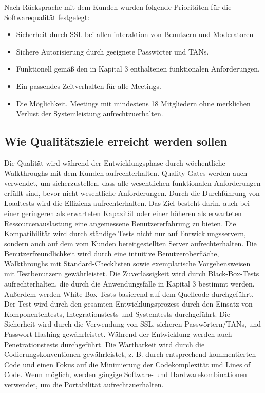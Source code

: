     Nach Rücksprache mit dem Kunden wurden folgende Prioritäten für die Softwarequalität festgelegt:

		\begin{itemize}
			\item Sicherheit durch SSL bei allen interaktion von Benutzern und Moderatoren
            \item Sichere Autorisierung durch geeignete Passwörter und TANs.
            \item Funktionell gemäß den in Kapital 3 enthaltenen funktionalen Anforderungen.
            \item Ein passendes Zeitverhalten für alle Meetings.
            \item Die Möglichkeit, Meetings mit mindestens 18 Mitgliedern ohne merklichen Verlust der Systemleistung aufrechtzuerhalten.

		\end{itemize}

	\subsection{Wie Qualitätsziele erreicht werden sollen}
	
	Die Qualität wird während der Entwicklungsphase durch wöchentliche Walkthroughs mit dem Kunden aufrechterhalten. Quality Gates werden auch verwendet, um sicherzustellen, dass alle wesentlichen funktionalen Anforderungen erfüllt sind, bevor nicht wesentliche Anforderungen.
	\linebreak
	Durch die Durchführung von Loadtests wird die Effizienz aufrechterhalten. Das Ziel besteht darin, auch bei einer geringeren als erwarteten Kapazität oder einer höheren als erwarteten Ressourcenauslastung eine angemessene Benutzererfahrung zu bieten.
	\linebreak
	Die Kompatibilität wird durch ständige Tests nicht nur auf Entwicklungsservern, sondern auch auf dem vom Kunden bereitgestellten Server aufrechterhalten.
	\linebreak
	Die Benutzerfreundlichkeit wird durch eine intuitive Benutzeroberfläche, Walkthroughs mit Standard-Checklisten sowie exemplarische Vorgehensweisen mit Testbenutzern gewährleistet.
	\linebreak
	Die Zuverlässigkeit wird durch Black-Box-Tests aufrechterhalten, die durch die Anwendungsfälle in Kapital 3 bestimmt werden. Außerdem werden White-Box-Tests basierend auf dem Quellcode durchgeführt. Der Test wird durch den gesamten Entwicklungsprozess durch den Einsatz von Komponententests, Integrationstests und Systemtests durchgeführt.
	\linebreak
	Die Sicherheit wird durch die Verwendung von SSL, sicheren Passwörtern/TANs, und Passwort-Hashing gewährleistet. Während der Entwicklung werden auch Penetrationstests durchgeführt.
	\linebreak
	Die Wartbarkeit wird durch die Codierungskonventionen gewährleistet, z. B. durch entsprechend kommentierten Code und einen Fokus auf die Minimierung der Codekomplexität und Lines of Code.
	\linebreak
	Wenn möglich, werden gängige Software- und Hardwarekombinationen verwendet, um die Portabilität aufrechtzuerhalten.
